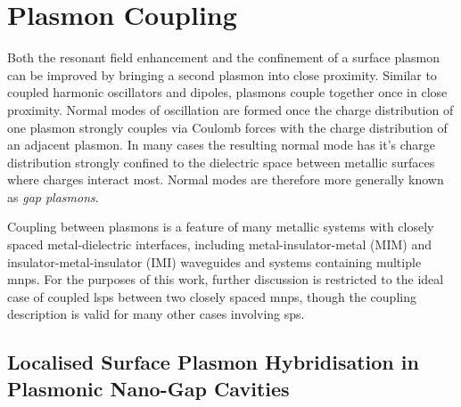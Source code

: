 \documentclass{article}
\begin{document}
\section{Plasmon Coupling}

Both the resonant field enhancement and the confinement of a surface plasmon can be improved by bringing a second plasmon into close proximity. Similar to coupled harmonic oscillators and dipoles, plasmons couple together once in close proximity. Normal modes of oscillation are formed once the charge distribution of one plasmon strongly couples via Coulomb forces with the charge distribution of an adjacent plasmon. In many cases the resulting normal mode has it's charge distribution strongly confined to the dielectric space between metallic surfaces where charges interact most. Normal modes are therefore more generally known as \emph{gap plasmons}.

Coupling between plasmons is a feature of many metallic systems with closely spaced metal-dielectric interfaces, including metal-insulator-metal (MIM) and insulator-metal-insulator (IMI) waveguides and systems containing multiple \glspl{mnp}. For the purposes of this work, further discussion is restricted to the ideal case of coupled \glspl{lsp} between two closely spaced \glspl{mnp}, though the coupling description is valid for many other cases involving \glspl{sp}.

\subsection{Localised Surface Plasmon Hybridisation in Plasmonic Nano-Gap Cavities}
\end{document}
